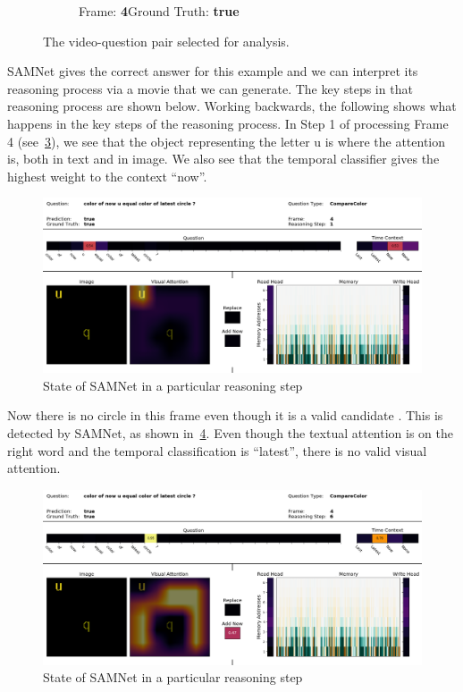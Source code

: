 \begin{figure}[!h]
\begin{subfigure}{0.25\textwidth}
	\caption{Frame: \textbf{4}\newline Ground Truth: \textbf{true}}
	\label{fig:frame-4}
  \end{subfigure}%
  \hfill\null
  \newline
  \centering
\caption{The video-question pair selected for analysis.} 
\label{fig:frame-seq}  
\end{figure}

SAMNet gives the correct answer for this example and we can interpret its reasoning process via a movie that we can generate.
The key steps in that reasoning process are shown below. Working backwards, the following shows what happens in the key steps
of the reasoning process.
In Step 1 of processing Frame 4 (see~\cref{fig:frame-4-step-1}), we see that the object representing the letter u is where the attention 
is, both in text and in image. We also see that the temporal classifier gives the highest weight to the context ``now''.
\begin{figure}[!h]
\centering
  \includegraphics[width=\textwidth]{"../img/visualization/sample 2/Frame 4 Step 1"}
\caption{State of SAMNet in a particular reasoning step} 
\label{fig:frame-4-step-1}
\end{figure}

Now there is no circle in this frame even though it is a valid candidate . This is detected by SAMNet,
as shown in~\cref{fig:frame-4-step-6}. Even though the textual attention is on the right word
and the temporal classification is ``latest'', there
is no valid visual attention.
\begin{figure}[!h]
	\centering
	\includegraphics[width=\textwidth]{"../img/visualization/sample 2/Frame 4 Step 6"}
	\caption{State of SAMNet in a particular reasoning step} 
	\label{fig:frame-4-step-6}
\end{figure}

